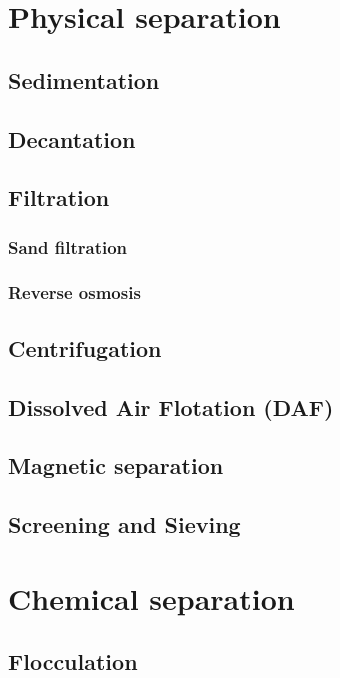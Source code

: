 \documentclass{article}
\begin{document}
\section{Physical separation}
\subsection{Sedimentation}

\subsection{Decantation}

\subsection{Filtration}

\subsubsection{Sand filtration}

\subsubsection{Reverse osmosis}

\subsection{Centrifugation}

\subsection{Dissolved Air Flotation (DAF)}

\subsection{Magnetic separation}

\subsection{Screening and Sieving}

\newpage
\section{Chemical separation}

\subsection{Flocculation}
\end{document}
